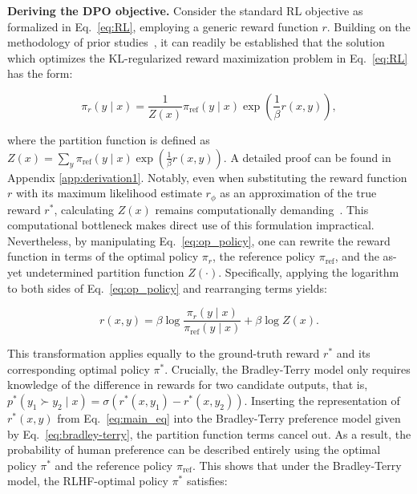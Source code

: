 \textbf{Deriving the DPO objective.} Consider the standard RL objective as formalized in Eq.~\ref{eq:RL}, employing a generic reward function $r$. Building on the methodology of prior studies~\citep{peters2007reinforcement, peng2019advantage, korbak2022reinforcement, go2023aligning}, it can readily be established that the solution which optimizes the KL-regularized reward maximization problem in Eq.~\ref{eq:RL} has the form:

\begin{equation}\label{eq:op_policy}
    \pi_r(y\mid x) = \frac{1}{Z(x)}\pi_\text{ref}(y\mid x)\exp\left(\frac{1}{\beta}r(x, y)\right),
\end{equation}

where the partition function is defined as $Z(x) =\sum_{y}\pi_\text{ref}(y\mid x)\exp\left(\frac{1}{\beta}r(x, y)\right)$. A detailed proof can be found in Appendix \ref{app:derivation1}. Notably, even when substituting the reward function $r$ with its maximum likelihood estimate $r_\phi$ as an approximation of the true reward $r^*$, calculating $Z(x)$ remains computationally demanding~\citep{korbak2022reinforcement, go2023aligning}. This computational bottleneck makes direct use of this formulation impractical. Nevertheless, by manipulating Eq.~\ref{eq:op_policy}, one can rewrite the reward function in terms of the optimal policy $\pi_r$, the reference policy $\pi_\text{ref}$, and the as-yet undetermined partition function $Z(\cdot)$. Specifically, applying the logarithm to both sides of Eq.~\ref{eq:op_policy} and rearranging terms yields:

\begin{equation}\label{eq:main_eq}
    r(x,y) =\beta \log \frac{\pi_r(y\mid x)}{\pi_\text{ref}(y\mid x)} + \beta \log Z(x).
\end{equation}

This transformation applies equally to the ground-truth reward $r^*$ and its corresponding optimal policy $\pi^*$. Crucially, the Bradley-Terry model only requires knowledge of the difference in rewards for two candidate outputs, that is, ${p^*(y_1 \succ y_2 \mid x) = \sigma(r^*(x, y_1) - r^*(x, y_2))}$. Inserting the representation of $r^*(x, y)$ from Eq.~\ref{eq:main_eq} into the Bradley-Terry preference model given by Eq.~\ref{eq:bradley-terry}, the partition function terms cancel out. As a result, the probability of human preference can be described entirely using the optimal policy $\pi^*$ and the reference policy $\pi_\text{ref}$. This shows that under the Bradley-Terry model, the RLHF-optimal policy $\pi^*$ satisfies:

